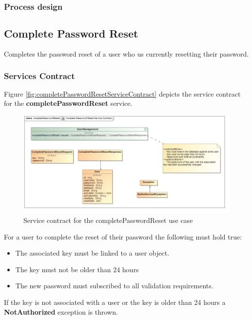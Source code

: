 \subsubsection{Process design}

\subsection{Complete Password Reset}
Completes the password reset of a user who us currently resetting their password.

\subsubsection{Services Contract}
Figure \ref{fig:completePasswordResetServiceContract} depicts the service contract for the \textbf{completePasswordReset} service.

\begin{figure}[H]
  \begin{center}
  \includegraphics[scale=0.55]{../Diagrams and Charts/Users/Complete Password Reset Service Contract.jpg}
  \caption{Service contract for the completePasswordReset use case}
  \label{fig:completePasswordResetServicesContract}
  \end{center}  
\end{figure}

For a user to complete the reset of their password the following must hold true:
\begin{itemize}
	\item The associated key must be linked to a user object.
	\item The key must not be older than 24 hours
	\item The new password must subscribed to all validation requirements.
\end{itemize}

If the key is not associated with a user or the key is older than 24 hours a \textbf{NotAuthorized} exception is thrown.

